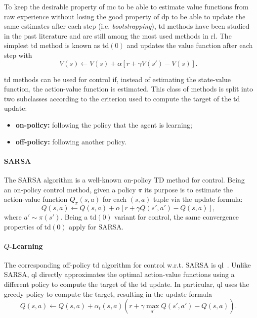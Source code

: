 To keep the desirable property of \gls{mc} to be able to estimate value functions from raw experience without losing the good property of \gls{dp} to be able to update the same estimates after each step (i.e. \textit{bootstrapping}), \gls{td} methods have been studied in the past literature and are still among the most used methods in \gls{rl}. The simplest \gls{td} method is known as \gls{td}$(0)$ and updates the value function after each step with
\begin{equation}
 V(s) \gets V(s) + \alpha [r + \gamma V(s') - V(s)].
\end{equation}

\gls{td} methods can be used for control if, instead of estimating the state-value function, the action-value function is estimated. This class of methods is split into two subclasses according to the criterion used to compute the target of the \gls{td} update:
\begin{itemize}
 \item \textbf{on-policy:} following the policy that the agent is learning;
 \item \textbf{off-policy:} following another policy.
\end{itemize}

\paragraph{SARSA}\label{S:SARSA}
The SARSA algorithm is a well-known on-policy TD method for control. Being an on-policy control method, given a policy $\pi$ its purpose is to estimate the action-value function $Q_\pi(s,a)$ for each $(s,a)$ tuple via the update formula:
\begin{equation}
 Q(s,a) \gets Q(s,a) + \alpha [r + \gamma Q(s',a') - Q(s,a)],
\end{equation}
where $a' \sim \pi(s')$. Being a \gls{td}$(0)$ variant for control, the same convergence properties of \gls{td}$(0)$ apply for SARSA.
\paragraph{$Q$-Learning}\label{S:Q-Learning}
The corresponding off-policy \gls{td} algorithm for control w.r.t. SARSA is \gls{ql}~\cite{watkins1989learning}. Unlike SARSA, \gls{ql} directly approximates the optimal action-value functions using a different policy to compute the target of the \gls{td} update. In particular, \gls{ql} uses the greedy policy to compute the target, resulting in the update formula
\begin{equation}\label{eq:Q-formula}
 Q(s,a) \gets Q(s,a) + \alpha_t(s,a) \left(r + \gamma \max_{a'} Q(s',a') - Q(s,a)\right).
\end{equation}

